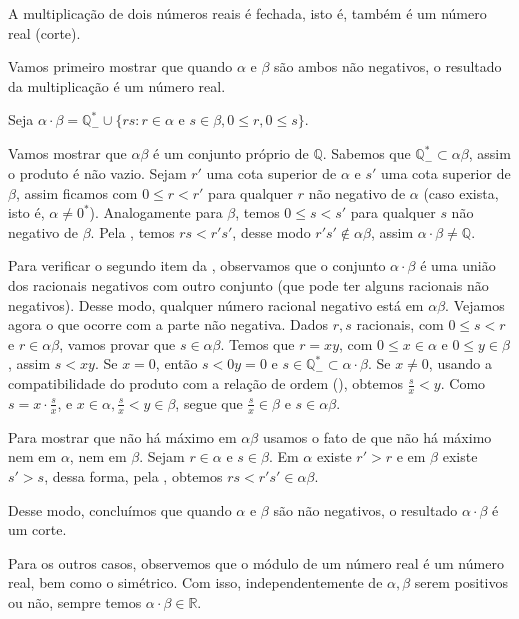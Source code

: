 \documentclass[../main.tex]{subfiles}
\begin{document}
\begin{prop}\label{reais-prop-produtoFechado}
    A multiplicação de dois números reais é fechada, isto é, também é um número real (corte).
\end{prop}
\begin{dem}
    Vamos primeiro mostrar que quando $\alpha$ e $\beta$ são ambos não negativos, o resultado da multiplicação é um número real. 

    Seja $\alpha \cdot \beta = \mathbb{Q}^*_{-} \cup \{ rs : r \in \alpha \text{ e } s \in \beta, 0 \leq r, 0 \leq s \}$.
    
    Vamos mostrar que $\alpha\beta$ é um conjunto próprio de $\mathbb{Q}$. Sabemos que $\mathbb{Q}^*_{-} \subset \alpha \beta$, assim o produto é não vazio. Sejam $r'$ uma cota superior de $\alpha$ e $s'$ uma cota superior de $\beta$, assim ficamos com $0 \leq r < r'$ para qualquer $r$ não negativo de $\alpha$ (caso exista, isto é, $\alpha \neq 0^*$). Analogamente para $\beta$, temos $0 \leq s < s'$ para qualquer $s$ não negativo de $\beta$. Pela , temos $rs < r's'$, desse modo $r's' \not\in \alpha \beta$, assim $\alpha \cdot \beta \neq \mathbb{Q}$.

    Para verificar o segundo item da , observamos que o conjunto $\alpha \cdot \beta$ é uma união dos racionais negativos com outro conjunto (que pode ter alguns racionais não negativos). Desse modo, qualquer número racional negativo está em $\alpha \beta$. Vejamos agora o que ocorre com a parte não negativa. Dados $r,s$ racionais, com $0 \leq s < r$ e $r \in \alpha \beta$, vamos provar que  $s \in \alpha \beta$. Temos que $r = xy$, com $0 \leq x \in \alpha$ e $0 \leq y \in \beta$, assim $s < xy$. Se $x = 0$, então $s < 0y = 0$ e $s \in \mathbb{Q}_{-}^* \subset \alpha \cdot \beta$. Se $x \neq 0$, usando a compatibilidade do produto com a relação de ordem (), obtemos $\frac{s}{x} < y$. Como $s = x \cdot \frac{s}{x}$, e $x \in \alpha, \frac{s}{x} < y \in \beta$, segue que $\frac{s}{x} \in \beta$ e $s \in \alpha \beta$.    

    Para mostrar que não há máximo em $\alpha \beta$ usamos o fato de que não há máximo nem em $\alpha$, nem em $\beta$. Sejam $r \in \alpha$ e $s \in \beta$. Em $\alpha$ existe $r' > r$ e em $\beta$ existe $s' > s$, dessa forma, pela , obtemos $rs < r's'  \in \alpha \beta$.

    Desse modo, concluímos que quando $\alpha$ e $\beta$ são não negativos, o resultado $\alpha \cdot \beta$ é um corte.

    Para os outros casos, observemos que o módulo de um número real é um número real, bem como o simétrico. Com isso, independentemente de $\alpha, \beta$ serem positivos ou não, sempre temos $\alpha \cdot \beta \in \mathbb{R}$.
\end{dem}
\end{document}
